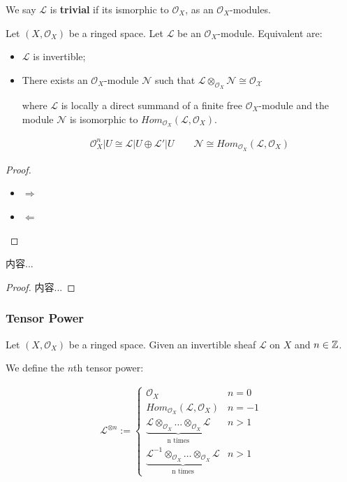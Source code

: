 \documentclass[Total.tex]{subfiles}
\begin{document}
			We say $\mathcal{L}$ is \textbf{trivial} if its ismorphic to $\mathcal{O}_X$, as an $\mathcal{O}_X$-modules.
			
			\begin{lemma}
				Let $(X,\mathcal{O}_X)$ be a ringed space. Let $\mathcal{L}$ be an $\mathcal{O}_X$-module. Equivalent are:
				
				\begin{itemize}
					\item $\mathcal{L}$ is invertible;
					\item There exists an $\mathcal{O}_X$-module $\mathcal{N}$ such that $\mathcal{L}\otimes_{\mathcal{O}_X} \mathcal{N}\cong \mathcal{O_X}$
					
					where $\mathcal{L}$ is locally a direct summand of a finite free $\mathcal{O}_X$-module and the module $\mathcal{N}$ is isomorphic to $Hom_{\mathcal{O}_X}(\mathcal{L},\mathcal{O}_X)$.
					
					\begin{gather*}
						\mathcal{O}_X^n|U\cong \mathcal{L}|U\oplus \mathcal{L}'|U\qquad \mathcal{N}\cong Hom_{\mathcal{O}_X}(\mathcal{L},\mathcal{O}_X)
					\end{gather*}
				\end{itemize}
			\end{lemma}
			
			\begin{proof}
				\begin{itemize}
					\item $\Rightarrow$
					\item $\Leftarrow$
				\end{itemize}
			\end{proof}
			
			\begin{lemma}
				内容...
			\end{lemma}
			\begin{proof}
				内容...
			\end{proof}
			\subsubsection{Tensor Power}
				\begin{Def}
					Let $(X,\mathcal{O}_X)$ be a ringed space. Given an invertible sheaf $\mathcal{L}$ on $X$ and $n\in \mathbb{Z}$. 
					
					We define the $n$th tensor power:
					
					\begin{gather*}
						\mathcal{L}^{\otimes n}:=\begin{cases}
							\mathcal{O}_X&n=0\\
							Hom_{\mathcal{O}_X}(\mathcal{L},\mathcal{O}_X)&n=-1\\
							\underbrace{\mathcal{L}\otimes_{\mathcal{O}_X} \dots\otimes_{\mathcal{O}_X} \mathcal{L}}_{\mbox{n times}}&n>1\\
							\underbrace{\mathcal{L}^{-1}\otimes_{\mathcal{O}_X} \dots\otimes_{\mathcal{O}_X} \mathcal{L}}_{\mbox{n times}}&n>1
						\end{cases}
					\end{gather*}
				\end{Def}
			
\end{document}
